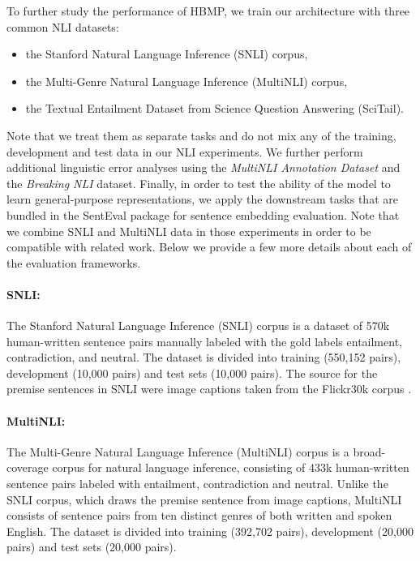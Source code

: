 \documentclass{nle}
\begin{document}
To further study the performance of HBMP, we
train our architecture with three common NLI datasets:
\begin{itemize}
\item the Stanford Natural Language Inference (SNLI) corpus,
\item the Multi-Genre Natural Language Inference (MultiNLI) corpus,
\item the Textual Entailment Dataset from Science Question Answering (SciTail).
\end{itemize}
Note that we treat them as separate tasks and do not mix any of the training, development and test data in our NLI experiments. We further perform additional linguistic error analyses using the {\em MultiNLI Annotation Dataset} and the {\em Breaking NLI} dataset. Finally, in order to test the ability of the model to learn general-purpose representations, we apply the downstream tasks that are bundled in the SentEval package for sentence embedding evaluation.
Note that we combine SNLI and MultiNLI data in those experiments in order to be compatible with related work.
Below we provide a few more details about each of the evaluation frameworks.

\paragraph{SNLI:}
The Stanford Natural Language Inference (SNLI) corpus \citep{snli} is a dataset of 570k human-written sentence pairs manually labeled with the gold labels entailment, contradiction, and neutral. The dataset is divided into training (550,152 pairs), development (10,000 pairs) and test sets (10,000 pairs). The source for the premise sentences in SNLI were image captions taken from the Flickr30k corpus \citep{Flickr:TACL229}.

\paragraph{MultiNLI:}
The Multi-Genre Natural Language Inference (MultiNLI) corpus \citep{multinli} is a broad-coverage corpus for natural language inference, consisting of 433k human-written sentence pairs labeled with entailment, contradiction and neutral. Unlike the SNLI corpus, which draws the premise sentence from image captions, MultiNLI consists of sentence pairs from ten distinct genres of both written and spoken English. The dataset is divided into training (392,702 pairs), development (20,000 pairs) and test sets (20,000 pairs).
\end{document}
